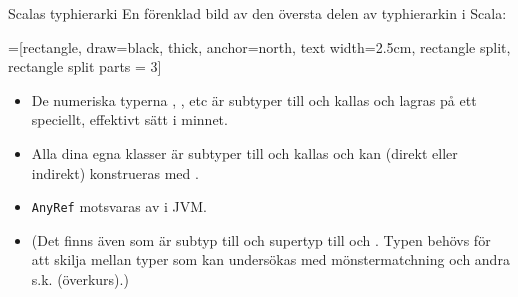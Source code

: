 \begin{Slide}{Scalas typhierarki}\SlideFontSmall
En förenklad bild av den översta delen av typhierarkin i Scala:
\vspace{0.5em}
\begin{center}
\newcommand{\TextBox}[1]{\raisebox{0pt}[1em][0.5em]{#1}}
=[rectangle, draw=black,  thick, anchor=north, text width=2.5cm, rectangle split, rectangle split parts = 3]
\end{center}
\begin{itemize}\SlideFontSmall
\item De numeriska typerna , , etc är subtyper till  och kallas  och lagras på ett speciellt, effektivt sätt i minnet.
\item Alla dina egna klasser är subtyper till  och kallas  och kan (direkt eller indirekt) konstrueras med .
\item \texttt{AnyRef} motsvaras av  i JVM.
\pause\item {\SlideFontTiny (Det finns även  som är subtyp till  och supertyp till  och . Typen  behövs för att skilja mellan typer som kan undersökas med mönstermatchning och andra s.k.  (överkurs).) }
\end{itemize}
\end{Slide}



